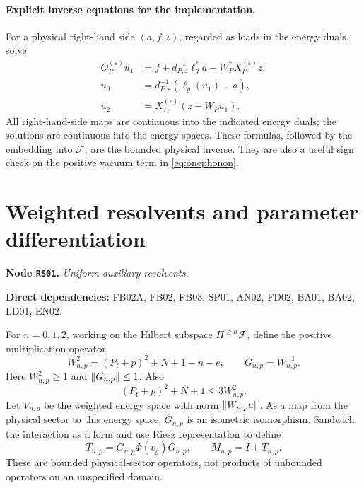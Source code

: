 \documentclass[11pt,a4paper]{article}
\theoremstyle{remark}\newtheorem{remark}[theorem]{Remark}
\newcommand{\F}{\mathcal F}\newcommand{\Q}{\mathcal Q}\newcommand{\HH}{\mathcal H}
\newcommand{\Pf}{P_{\mathrm f}}\newcommand{\Id}{I}\newcommand{\Dom}{\operatorname{Dom}}
\newcommand{\node}[3]{\par\Needspace{6\baselineskip}\smallskip\hypertarget{node:#1}{}\label{nodepage:#1}\noindent\textbf{Node \texttt{#1}.} \textit{#2.}\par\noindent\textbf{Direct dependencies:} #3.\par}
\begin{document}
\paragraph{Explicit inverse equations for the implementation.}
For a physical right-hand side $(a,f,z)$, regarded as loads in the energy duals, solve
\begin{align*}
 O_P^{(\varepsilon)}u_1&=f+d_{P,\varepsilon}^{-1}\ell_g^*a
                         -W_P^*X_P^{(\varepsilon)}z,\\
 u_0&=d_{P,\varepsilon}^{-1}(\ell_g(u_1)-a),\\
 u_2&=X_P^{(\varepsilon)}(z-W_Pu_1).
\end{align*}
All right-hand-side maps are continuous into the indicated energy duals; the solutions are continuous into the energy spaces. These formulas, followed by the embedding into $\F$, are the bounded physical inverse. They are also a useful sign check on the positive vacuum term in \eqref{eq:onephonon}.

\section{Weighted resolvents and parameter differentiation}\label{sec:resolvents}
\node{RS01}{Uniform auxiliary resolvents}{FB02A, FB02, FB03, SP01, AN02, FD02, BA01, BA02, LD01, EN02}
For $n=0,1,2$, working on the Hilbert subspace $\Pi^{\geq n}\F$, define the positive multiplication operator
\[
 W_{n,p}^2=(\Pf+p)^2+N+1-n-e,
 \qquad G_{n,p}=W_{n,p}^{-1}.
\]
Here $W_{n,p}^2\geq1$ and $\lVert G_{n,p}\rVert\leq1$. Also
\begin{equation}
 (\Pf+p)^2+N+1\leq3W_{n,p}^2.\label{eq:weightcompare}
\end{equation}
Let $V_{n,p}$ be the weighted energy space with norm $\lVert W_{n,p}u\rVert$. As a map from the physical sector to this energy space, $G_{n,p}$ is an isometric isomorphism. Sandwich the interaction as a form and use Riesz representation to define
\[
 T_{n,p}=G_{n,p}\Phi(v_g)G_{n,p},\qquad M_{n,p}=I+T_{n,p}.
\]
These are bounded physical-sector operators, not products of unbounded operators on an unspecified domain.
\end{document}
